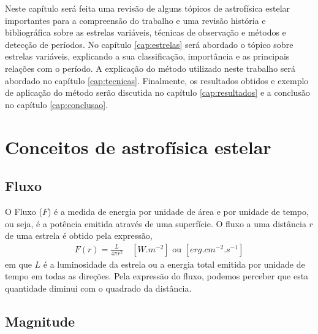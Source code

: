 
Neste capítulo será feita uma revisão de alguns tópicos de astrofísica estelar importantes para a compreensão do trabalho e uma revisão história e bibliográfica sobre as estrelas variáveis, técnicas de observação e métodos e detecção de períodos. No capítulo \ref{cap:estrelas} será abordado o tópico sobre estrelas variáveis, explicando a sua classificação, importância e as principais relações com o período. A explicação do método utilizado neste trabalho será abordado no capítulo \ref{cap:tecnicas}. Finalmente, os resultados obtidos e exemplo de aplicação do método serão discutida no capítulo \ref{cap:resultados} e a conclusão no capítulo \ref{cap:conclusao}.



\section{Conceitos de astrofísica estelar}

\nocite{karttunenLivro}

\subsection{Fluxo}

O Fluxo ($F$) é a medida de energia por unidade de área e por unidade de tempo, ou seja, é a potência emitida através de uma superfície. O fluxo a uma distância $r$ de uma estrela é obtido pela expressão,
\begin{align}
F(r) = \frac{L}{4\pi r^2} \quad \left[ \si{W.m^{-2}}\right] \,\, \text{ou} \,\, \left[\si{erg.cm^{-2}.s^{-1}}\right] \label{eq:fluxo}
\end{align}
em que $L$ é a luminosidade da estrela ou a energia total emitida por unidade de tempo em todas as direções. Pela expressão do fluxo, podemos perceber que esta quantidade diminui com o quadrado da distância.

\subsection{Magnitude}

